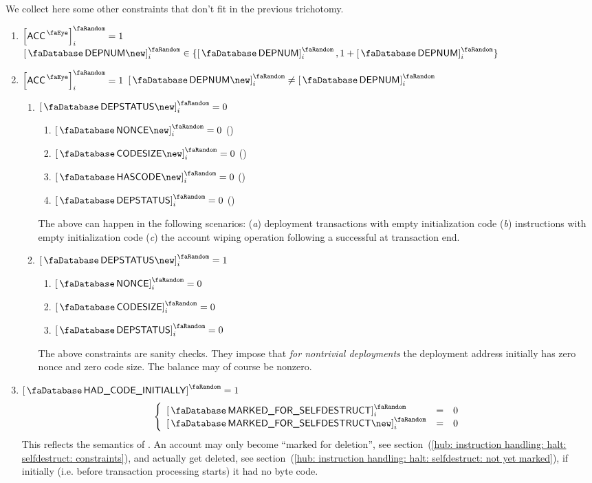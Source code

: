 We collect here some other constraints that don't fit in the previous trichotomy.
\begin{enumerate}
	\item
		\If $\order{\peekAccount} _{i} = 1$
		\Then $\order{\accDeploymentNumber \new }_{i} \in \{ \order{\accDeploymentNumber  }_{i}, 1 + \order{\accDeploymentNumber  }_{i} \}$
	\item
		\If $\order{\peekAccount} _{i} = 1$
		\et $\order{\accDeploymentNumber \new }_{i} \neq \order{\accDeploymentNumber  }_{i}$
		\begin{enumerate}
			\item
				\If $\order{\accDeploymentStatus \new }_{i} = 0$
				\Then
				\begin{enumerate}
					\item $\order{\accNonce        \new } _{i} = 0$ \quad (\trash)
					\item $\order{\accCodesize     \new } _{i} = 0$ \quad (\trash)
					\item $\order{\accHasCode      \new } _{i} = 0$ \quad (\trash)
					\item $\order{\accDeploymentStatus  } _{i} = 0$ \quad (\trash)
				\end{enumerate}
				\saNote{}
				The above can happen in the following scenarios:
				(\emph{a}) deployment transactions with empty initialization code
				(\emph{b})  instructions with empty initialization code
				(\emph{c}) the account wiping operation following a successful  at transaction end.
			\item
				\If $\order{\accDeploymentStatus \new }_{i} = 1$
				\Then
				\begin{enumerate}
					\item $\order{\accNonce             } _{i} = 0$
					\item $\order{\accCodesize          } _{i} = 0$
					\item $\order{\accDeploymentStatus  } _{i} = 0$
				\end{enumerate}
				\saNote{}
				The above constraints are sanity checks.
				They impose that \emph{for nontrivial deployments} the deployment address
				initially has zero nonce and zero code size.
				The balance may of course be nonzero.
		\end{enumerate}
	\item
		\If   $\order{\accHadCodeInitially} = 1$
		\Then
		\[
			\left\{ \begin{array}{lcl}
				\order{\accMarkedForSelfdestruct     } _{i} & = & 0 \\
				\order{\accMarkedForSelfdestruct \new} _{i} & = & 0 \\
			\end{array} \right.
		\]
		\saNote{}
		This reflects the  semantics of \cite{EIP-6780}.
		An account may only become ``marked for deletion'',
		see section~(\ref{hub: instruction handling: halt: selfdestruct: constraints}),
		and actually get deleted,
		see section~(\ref{hub: instruction handling: halt: selfdestruct: not yet marked}),
		if initially (i.e. before transaction processing starts) it had no byte code.
\end{enumerate}
